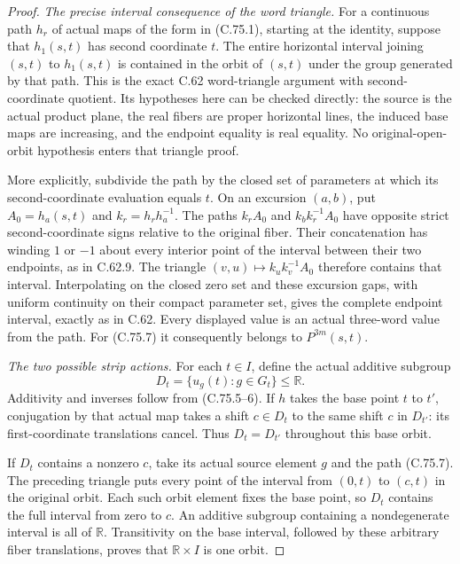 \begin{proof}
\emph{The precise interval consequence of the word triangle.}
For a continuous path $h_r$ of actual
maps of the form in (C.75.1), starting at
the identity, suppose that $h_1(s,t)$
has second coordinate $t$.
The entire horizontal interval joining
$(s,t)$ to $h_1(s,t)$ is contained in
the orbit of $(s,t)$ under the group
generated by that path.
This is the exact C.62 word-triangle
argument with second-coordinate quotient.
Its hypotheses here can be checked directly:
the source is the actual product plane,
the real fibers are proper horizontal
lines, the induced base maps are
increasing, and the endpoint equality
is real equality.
No original-open-orbit hypothesis
enters that triangle proof.

More explicitly, subdivide the path by
the closed set of parameters at which
its second-coordinate evaluation equals
$t$. On an excursion $(a,b)$, put
$A_0=h_a(s,t)$ and $k_r=h_rh_a^{-1}$.
The paths $k_rA_0$ and
$k_bk_r^{-1}A_0$ have opposite strict
second-coordinate signs relative to
the original fiber. Their concatenation
has winding $1$ or $-1$ about every
interior point of the interval between
their two endpoints, as in C.62.9.
The triangle $(v,u)\mapsto k_uk_v^{-1}A_0$
therefore contains that interval.
Interpolating on the closed zero set
and these excursion gaps, with uniform
continuity on their compact parameter
set, gives the complete endpoint
interval, exactly as in C.62.
Every displayed value is an actual
three-word value from the path.
For (C.75.7) it consequently belongs
to $P^{3m}(s,t)$.

\emph{The two possible strip actions.}
For each $t\in I$, define the actual
additive subgroup
\[
       D_t=\{u_g(t):g\in G_t\}\leq\mathbb R.
                                                               \tag{C.75.8}
\]
Additivity and inverses follow from
(C.75.5--6). If $h$ takes the base point
$t$ to $t'$, conjugation by that actual
map takes a shift $c\in D_t$ to the
same shift $c$ in $D_{t'}$:
its first-coordinate translations
cancel. Thus $D_t=D_{t'}$ throughout
this base orbit.

If $D_t$ contains a nonzero $c$, take
its actual source element $g$ and the
path (C.75.7). The preceding triangle
puts every point of the interval from
$(0,t)$ to $(c,t)$ in the original orbit.
Each such orbit element fixes the
base point, so $D_t$ contains the
full interval from zero to $c$.
An additive subgroup containing a
nondegenerate interval is all of
$\mathbb R$. Transitivity on the
base interval, followed by these
arbitrary fiber translations, proves
that $\mathbb R\times I$ is one orbit.


\end{proof}
